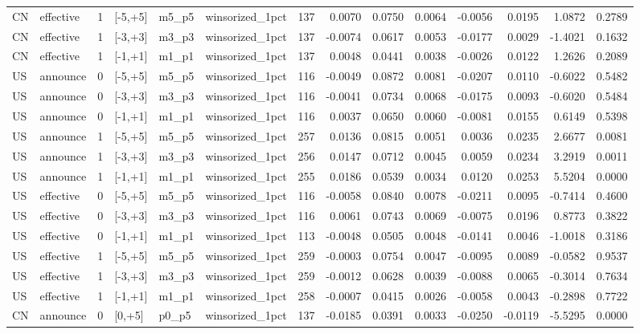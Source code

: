\begin{tabular}{llrlllrrrrrrrr}
CN & effective & 1 & [-5,+5] & m5_p5 & winsorized_1pct & 137 & 0.0070 & 0.0750 & 0.0064 & -0.0056 & 0.0195 & 1.0872 & 0.2789 \\
CN & effective & 1 & [-3,+3] & m3_p3 & winsorized_1pct & 137 & -0.0074 & 0.0617 & 0.0053 & -0.0177 & 0.0029 & -1.4021 & 0.1632 \\
CN & effective & 1 & [-1,+1] & m1_p1 & winsorized_1pct & 137 & 0.0048 & 0.0441 & 0.0038 & -0.0026 & 0.0122 & 1.2626 & 0.2089 \\
US & announce & 0 & [-5,+5] & m5_p5 & winsorized_1pct & 116 & -0.0049 & 0.0872 & 0.0081 & -0.0207 & 0.0110 & -0.6022 & 0.5482 \\
US & announce & 0 & [-3,+3] & m3_p3 & winsorized_1pct & 116 & -0.0041 & 0.0734 & 0.0068 & -0.0175 & 0.0093 & -0.6020 & 0.5484 \\
US & announce & 0 & [-1,+1] & m1_p1 & winsorized_1pct & 116 & 0.0037 & 0.0650 & 0.0060 & -0.0081 & 0.0155 & 0.6149 & 0.5398 \\
US & announce & 1 & [-5,+5] & m5_p5 & winsorized_1pct & 257 & 0.0136 & 0.0815 & 0.0051 & 0.0036 & 0.0235 & 2.6677 & 0.0081 \\
US & announce & 1 & [-3,+3] & m3_p3 & winsorized_1pct & 256 & 0.0147 & 0.0712 & 0.0045 & 0.0059 & 0.0234 & 3.2919 & 0.0011 \\
US & announce & 1 & [-1,+1] & m1_p1 & winsorized_1pct & 255 & 0.0186 & 0.0539 & 0.0034 & 0.0120 & 0.0253 & 5.5204 & 0.0000 \\
US & effective & 0 & [-5,+5] & m5_p5 & winsorized_1pct & 116 & -0.0058 & 0.0840 & 0.0078 & -0.0211 & 0.0095 & -0.7414 & 0.4600 \\
US & effective & 0 & [-3,+3] & m3_p3 & winsorized_1pct & 116 & 0.0061 & 0.0743 & 0.0069 & -0.0075 & 0.0196 & 0.8773 & 0.3822 \\
US & effective & 0 & [-1,+1] & m1_p1 & winsorized_1pct & 113 & -0.0048 & 0.0505 & 0.0048 & -0.0141 & 0.0046 & -1.0018 & 0.3186 \\
US & effective & 1 & [-5,+5] & m5_p5 & winsorized_1pct & 259 & -0.0003 & 0.0754 & 0.0047 & -0.0095 & 0.0089 & -0.0582 & 0.9537 \\
US & effective & 1 & [-3,+3] & m3_p3 & winsorized_1pct & 259 & -0.0012 & 0.0628 & 0.0039 & -0.0088 & 0.0065 & -0.3014 & 0.7634 \\
US & effective & 1 & [-1,+1] & m1_p1 & winsorized_1pct & 258 & -0.0007 & 0.0415 & 0.0026 & -0.0058 & 0.0043 & -0.2898 & 0.7722 \\
CN & announce & 0 & [0,+5] & p0_p5 & winsorized_1pct & 137 & -0.0185 & 0.0391 & 0.0033 & -0.0250 & -0.0119 & -5.5295 & 0.0000 \\

\end{tabular}
